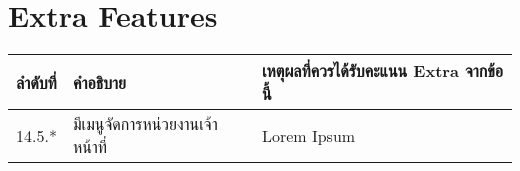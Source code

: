 \documentclass[../docs.tex]{subfiles}
\begin{document}
\section{Extra Features}

\begin{tabularx}{\textwidth}{ l l l }
ลำดับที่    & คำอธิบาย & เหตุผลที่ควรได้รับคะแนน Extra จากข้อนี้ \\
    \hline
14.5.*    & มีเมนูจัดการหน่วยงานเจ้าหน้าที่               & Lorem Ipsum
\end{tabularx}
\end{document}
